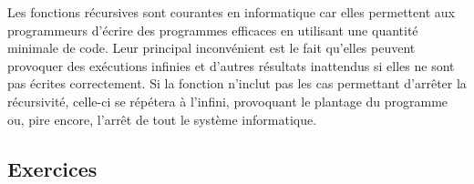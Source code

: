    Les fonctions récursives sont courantes en informatique car elles permettent aux programmeurs d'écrire des programmes efficaces en utilisant une quantité minimale de code. Leur principal inconvénient est le fait qu'elles peuvent provoquer des exécutions infinies et d'autres résultats inattendus si elles ne sont pas écrites correctement. Si la fonction n'inclut pas les cas permettant d'arrêter la récursivité, celle-ci se répétera à l'infini, provoquant le plantage du programme ou, pire encore, l'arrêt de tout le système informatique.\\
       
    \subsection{Exercices}

    
